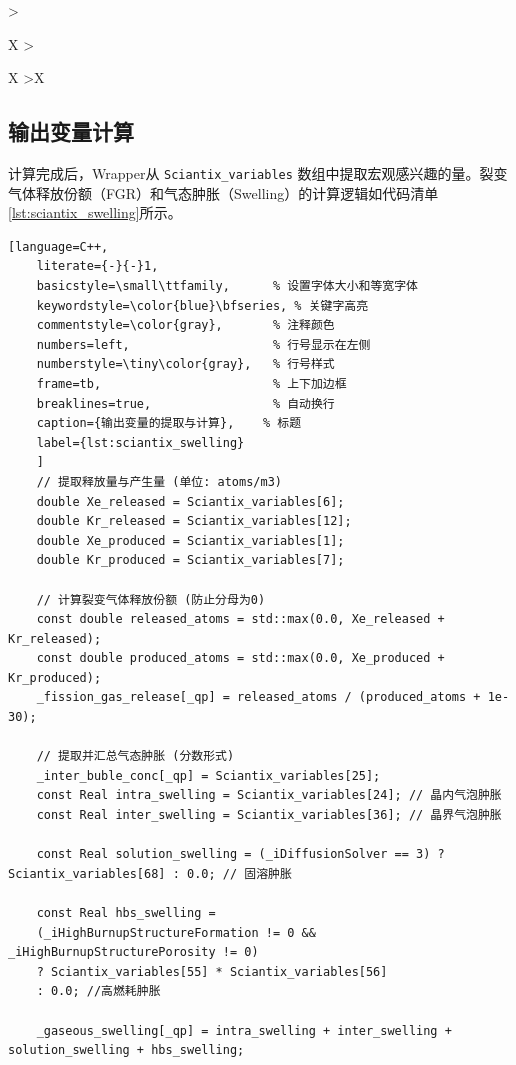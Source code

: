 \begin{xltabular}{\textwidth}{
		>{\hsize\raggedright\arraybackslash}X
		>{\hsize\raggedright\arraybackslash}X
		>{\hsize\centering\arraybackslash}X
	}
\end{xltabular}

\subsection{输出变量计算}
计算完成后，Wrapper从 \texttt{Sciantix\_variables} 数组中提取宏观感兴趣的量。裂变气体释放份额（FGR）和气态肿胀（Swelling）的计算逻辑如代码清单\ref{lst:sciantix_swelling}所示。

\begin{lstlisting}[language=C++,
	literate={-}{-}1, 
	basicstyle=\small\ttfamily,      % 设置字体大小和等宽字体
	keywordstyle=\color{blue}\bfseries, % 关键字高亮
	commentstyle=\color{gray},       % 注释颜色
	numbers=left,                    % 行号显示在左侧
	numberstyle=\tiny\color{gray},   % 行号样式
	frame=tb,                        % 上下加边框
	breaklines=true,                 % 自动换行
	caption={输出变量的提取与计算},    % 标题 
	label={lst:sciantix_swelling}
	]
	// 提取释放量与产生量 (单位: atoms/m3)
	double Xe_released = Sciantix_variables[6];
	double Kr_released = Sciantix_variables[12];
	double Xe_produced = Sciantix_variables[1];
	double Kr_produced = Sciantix_variables[7];
	
	// 计算裂变气体释放份额 (防止分母为0)
	const double released_atoms = std::max(0.0, Xe_released + Kr_released);
	const double produced_atoms = std::max(0.0, Xe_produced + Kr_produced);
	_fission_gas_release[_qp] = released_atoms / (produced_atoms + 1e-30);
	
	// 提取并汇总气态肿胀 (分数形式)
	_inter_buble_conc[_qp] = Sciantix_variables[25];
	const Real intra_swelling = Sciantix_variables[24]; // 晶内气泡肿胀
	const Real inter_swelling = Sciantix_variables[36]; // 晶界气泡肿胀
	
	const Real solution_swelling = (_iDiffusionSolver == 3) ? Sciantix_variables[68] : 0.0; // 固溶肿胀
	
	const Real hbs_swelling =
	(_iHighBurnupStructureFormation != 0 && _iHighBurnupStructurePorosity != 0)
	? Sciantix_variables[55] * Sciantix_variables[56]
	: 0.0; //高燃耗肿胀
	
	_gaseous_swelling[_qp] = intra_swelling + inter_swelling + solution_swelling + hbs_swelling;
\end{lstlisting}
